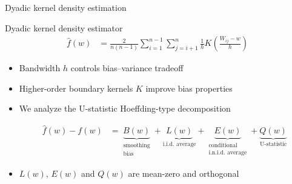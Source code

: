 \documentclass{beamer}
\begin{document}
\begin{frame}{Dyadic kernel density estimation}

  \vspace*{4mm}
  \begin{block}{Dyadic kernel density estimator}
    \vspace*{-4mm}
    \begin{align*}
      \hat f(w)
      &= \frac{2}{n(n-1)}
      \sum_{i=1}^{n-1} \sum_{j=i+1}^{n}
      \frac{1}{h} K\left(\frac{W_{i j} - w}{h}\right)
    \end{align*}
    \vspace*{-4mm}
  \end{block}

  \begin{itemize}
    \item
      Bandwidth $h$ controls bias--variance tradeoff
    \item
      Higher-order boundary kernels $K$
      improve bias properties
    \item We analyze the U-statistic Hoeffding-type decomposition

      \vspace*{-5mm}
      \begin{align*}
        \hat f(w) - f(w)
        &=
        \underbrace{B(w)}_{\substack{\text{smoothing}
        \\ \text{bias}}}
        + \underbrace{L(w)}_{\text{i.i.d.\ average}}
        + \underbrace{E(w)}_{\substack{\text{conditional}
        \\ \text{i.n.i.d.\ average}}}
        + \underbrace{Q(w)}_{\text{U-statistic}}
      \end{align*}

      \vspace*{-1mm}

    \item $L(w)$, $E(w)$ and $Q(w)$ are mean-zero and orthogonal

  \end{itemize}
\end{frame}
\end{document}
